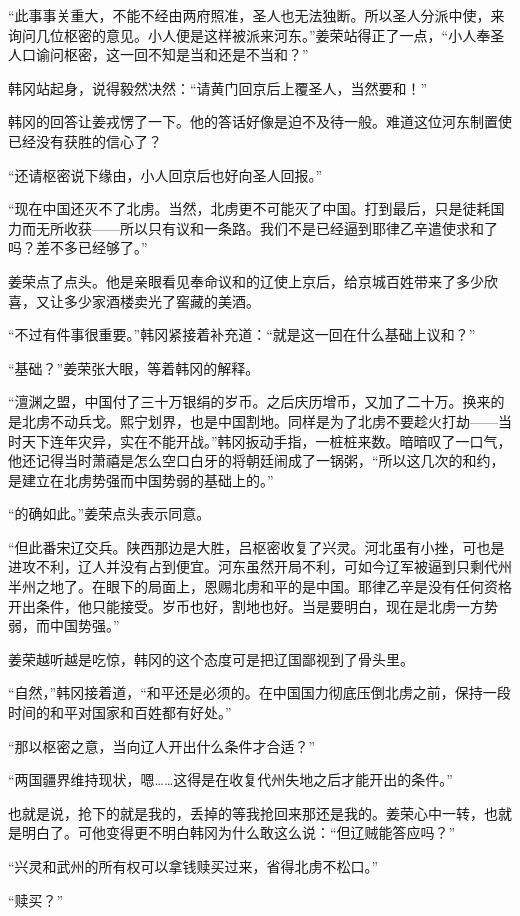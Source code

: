 “此事事关重大，不能不经由两府照准，圣人也无法独断。所以圣人分派中使，来询问几位枢密的意见。小人便是这样被派来河东。”姜荣站得正了一点，“小人奉圣人口谕问枢密，这一回不知是当和还是不当和？”

韩冈站起身，说得毅然决然：“请黄门回京后上覆圣人，当然要和！”

韩冈的回答让姜戎愣了一下。他的答话好像是迫不及待一般。难道这位河东制置使已经没有获胜的信心了？

“还请枢密说下缘由，小人回京后也好向圣人回报。”

“现在中国还灭不了北虏。当然，北虏更不可能灭了中国。打到最后，只是徒耗国力而无所收获——所以只有议和一条路。我们不是已经逼到耶律乙辛遣使求和了吗？差不多已经够了。”

姜荣点了点头。他是亲眼看见奉命议和的辽使上京后，给京城百姓带来了多少欣喜，又让多少家酒楼卖光了窖藏的美酒。

“不过有件事很重要。”韩冈紧接着补充道：“就是这一回在什么基础上议和？”

“基础？”姜荣张大眼，等着韩冈的解释。

“澶渊之盟，中国付了三十万银绢的岁币。之后庆历增币，又加了二十万。换来的是北虏不动兵戈。熙宁划界，也是中国割地。同样是为了北虏不要趁火打劫——当时天下连年灾异，实在不能开战。”韩冈扳动手指，一桩桩来数。暗暗叹了一口气，他还记得当时萧禧是怎么空口白牙的将朝廷闹成了一锅粥，“所以这几次的和约，是建立在北虏势强而中国势弱的基础上的。”

“的确如此。”姜荣点头表示同意。

“但此番宋辽交兵。陕西那边是大胜，吕枢密收复了兴灵。河北虽有小挫，可也是进攻不利，辽人并没有占到便宜。河东虽然开局不利，可如今辽军被逼到只剩代州半州之地了。在眼下的局面上，恩赐北虏和平的是中国。耶律乙辛是没有任何资格开出条件，他只能接受。岁币也好，割地也好。当是要明白，现在是北虏一方势弱，而中国势强。”

姜荣越听越是吃惊，韩冈的这个态度可是把辽国鄙视到了骨头里。

“自然，”韩冈接着道，“和平还是必须的。在中国国力彻底压倒北虏之前，保持一段时间的和平对国家和百姓都有好处。”

“那以枢密之意，当向辽人开出什么条件才合适？”

“两国疆界维持现状，嗯……这得是在收复代州失地之后才能开出的条件。”

也就是说，抢下的就是我的，丢掉的等我抢回来那还是我的。姜荣心中一转，也就是明白了。可他变得更不明白韩冈为什么敢这么说：“但辽贼能答应吗？”

“兴灵和武州的所有权可以拿钱赎买过来，省得北虏不松口。”

“赎买？”

